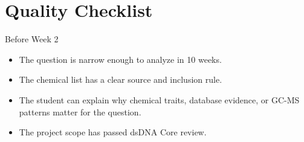 \section{Quality Checklist}
\begin{checklistbox}{Before Week 2}
\begin{itemize}
  \item The question is narrow enough to analyze in 10 weeks.
  \item The chemical list has a clear source and inclusion rule.
  \item The student can explain why chemical traits, database evidence, or GC-MS patterns matter for the question.
  \item The project scope has passed dsDNA Core review.
\end{itemize}
\end{checklistbox}
